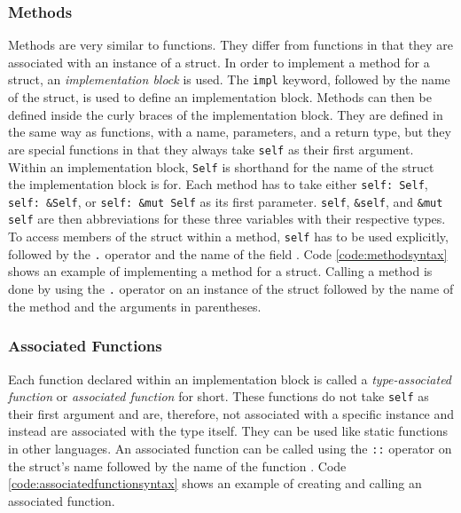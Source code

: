 \subsubsection{Methods}
Methods are very similar to functions.
They differ from functions in that they are associated with an instance of a struct.
In order to implement a method for a struct, an \textit{implementation block} is used.
The \texttt{impl} keyword, followed by the name of the struct, is used to define an implementation block.
Methods can then be defined inside the curly braces of the implementation block.
They are defined in the same way as functions, with a name, parameters, and a return type, but they are special functions in that they always take \texttt{self} as their first argument.
Within an implementation block, \texttt{Self} is shorthand for the name of the struct the implementation block is for.
Each method has to take either \texttt{self: Self}, \texttt{self: \&Self}, or \texttt{self: \&mut Self} as its first parameter.
\texttt{self}, \texttt{\&self}, and \texttt{\&mut self} are then abbreviations for these three variables with their respective types.
To access members of the struct within a method, \texttt{self} has to be used explicitly, followed by the \texttt{.} operator and the name of the field \cite[214-215]{Blandy_Jim2021-07-20}.
Code \ref{code:methodsyntax} shows an example of implementing a method for a struct.
Calling a method is done by using the \texttt{.} operator on an instance of the struct followed by the name of the method and the arguments in parentheses.


\subsubsection{Associated Functions}
Each function declared within an implementation block is called a \textit{type-associated function} or \textit{associated function} for short.
These functions do not take \texttt{self} as their first argument and are, therefore, not associated with a specific instance and instead are associated with the type itself.
They can be used like static functions in other languages.
An associated function can be called using the \texttt{::} operator on the struct's name followed by the name of the function \cite[219-220]{Blandy_Jim2021-07-20}.
Code \ref{code:associatedfunctionsyntax} shows an example of creating and calling an associated function.


